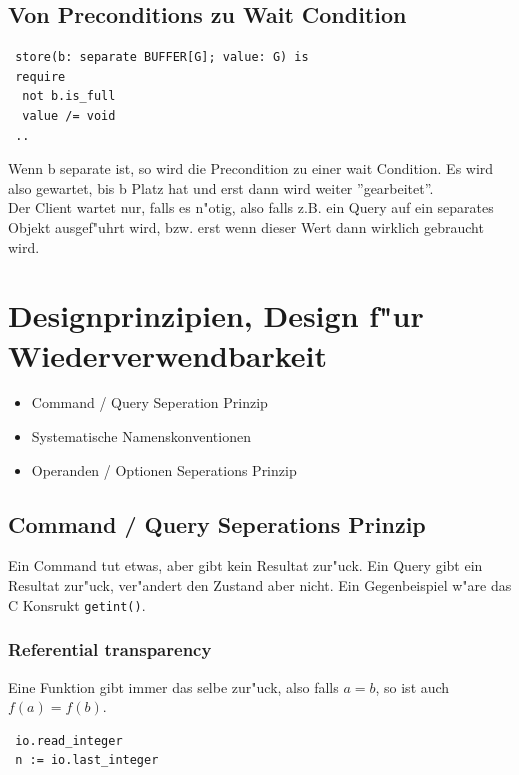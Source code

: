 \documentclass[german, 10pt, a4paper, twocolumn]{scrartcl}
\theoremstyle{definition}
\begin{document}
\subsection{Von Preconditions zu Wait Condition}

\begin{verbatim}
 store(b: separate BUFFER[G]; value: G) is
 require
  not b.is_full
  value /= void
 ..
\end{verbatim}

Wenn b separate ist, so wird die Precondition zu einer wait Condition. Es wird also gewartet, bis b Platz hat und erst dann wird weiter ''gearbeitet''.\\

Der Client wartet nur, falls es n"otig, also falls z.B. ein Query auf ein separates Objekt ausgef"uhrt wird, bzw. erst wenn dieser Wert dann wirklich gebraucht wird.

\section{Designprinzipien, Design f"ur Wiederverwendbarkeit}

\begin{itemize}
	\item Command / Query Seperation Prinzip
	\item Systematische Namenskonventionen
	\item Operanden / Optionen Seperations Prinzip
\end{itemize}

\subsection{Command / Query Seperations Prinzip}

Ein Command tut etwas, aber gibt kein Resultat zur"uck. Ein Query gibt ein Resultat zur"uck, ver"andert den Zustand aber nicht. Ein Gegenbeispiel w"are das C Konsrukt \verb#getint()#.

\subsubsection{Referential transparency}

Eine Funktion gibt immer das selbe zur"uck, also falls $a=b$, so ist auch $f(a) = f(b)$.

\begin{verbatim}
 io.read_integer
 n := io.last_integer
\end{verbatim}
\end{document}
